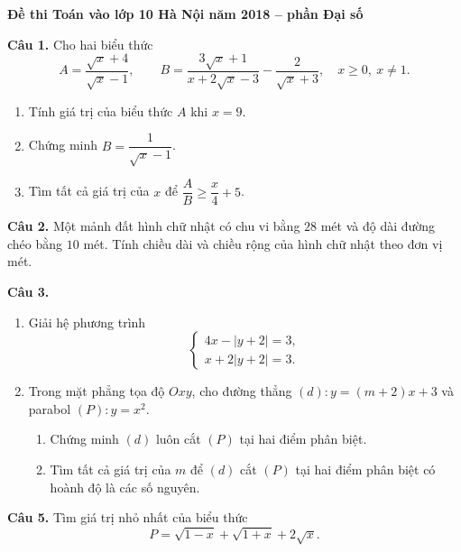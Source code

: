 \documentclass[12pt,a4paper]{article}
\begin{document}
\begin{center}
{\Large\bfseries Đề thi Toán vào lớp 10 Hà Nội năm 2018 -- phần Đại số}
\end{center}

\textbf{Câu 1.} Cho hai biểu thức
\[
A=\frac{\sqrt{x}+4}{\sqrt{x}-1},\qquad
B=\frac{3\sqrt{x}+1}{x+2\sqrt{x}-3}-\frac{2}{\sqrt{x}+3},
\quad x\ge 0,\ x\ne 1.
\]
\begin{enumerate}[label=\arabic*)]
  \item Tính giá trị của biểu thức $A$ khi $x=9$.
  \item Chứng minh $B=\dfrac{1}{\sqrt{x}-1}$.
  \item Tìm tất cả giá trị của $x$ để $\dfrac{A}{B}\ge \dfrac{x}{4}+5$.
\end{enumerate}

\textbf{Câu 2.} Một mảnh đất hình chữ nhật có chu vi bằng $28$ mét và độ dài đường chéo bằng $10$ mét. Tính chiều dài và chiều rộng của hình chữ nhật theo đơn vị mét.

\textbf{Câu 3.}
\begin{enumerate}[label=\arabic*)]
  \item Giải hệ phương trình
  \[
  \begin{cases}
  4x-|y+2|=3,\\
  x+2|y+2|=3.
  \end{cases}
  \]
  \item Trong mặt phẳng tọa độ $Oxy$, cho đường thẳng $(d):y=(m+2)x+3$ và parabol $(P):y=x^2$.
  \begin{enumerate}[label=\alph*)]
    \item Chứng minh $(d)$ luôn cắt $(P)$ tại hai điểm phân biệt.
    \item Tìm tất cả giá trị của $m$ để $(d)$ cắt $(P)$ tại hai điểm phân biệt có hoành độ là các số nguyên.
  \end{enumerate}
\end{enumerate}

\textbf{Câu 5.} Tìm giá trị nhỏ nhất của biểu thức
\[
P=\sqrt{1-x}+\sqrt{1+x}+2\sqrt{x}.
\]
\end{document}
